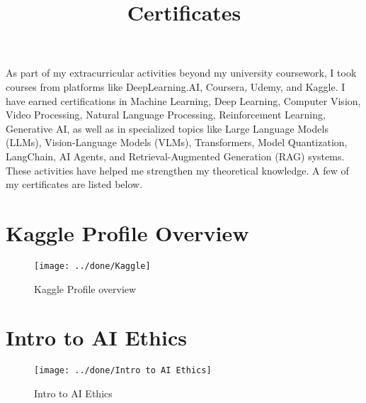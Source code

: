 \documentclass[a4paper,12pt]{article}
\date{}
\title {\textbf{Certificates}}
\begin{document}
	\maketitle
	\vspace{-60pt} %
As part of my extracurricular activities beyond my university coursework, I took courses from platforms like DeepLearning.AI, Coursera, Udemy, and Kaggle. I have earned certifications in Machine Learning, Deep Learning, Computer Vision, Video Processing, Natural Language Processing, Reinforcement Learning, Generative AI, as well as in specialized topics like Large Language Models (LLMs), Vision-Language Models (VLMs), Transformers, Model Quantization, LangChain, AI Agents, and Retrieval-Augmented Generation (RAG) systems. These activities have helped me strengthen my theoretical knowledge. A few of my certificates are listed below.
\section*{Kaggle Profile Overview}
\vspace{-2pt} %
\begin{figure}[h]
	\centering
	\vspace{-10pt} %
	\texttt{[image: ../done/Kaggle]}
	\vspace{-5pt} %
	\caption{Kaggle Profile overview}
	\vspace{-10pt}
\end{figure}


\newpage
\section*{Intro to AI Ethics}
\vspace{-10pt} %
\begin{figure}[h]
	\centering
	\vspace{-10pt} %
	\texttt{[image: ../done/Intro to AI Ethics]}
	\vspace{-10pt} %
	\caption{Intro to AI Ethics}
	\vspace{-10pt}
\end{figure}
\end{document}
